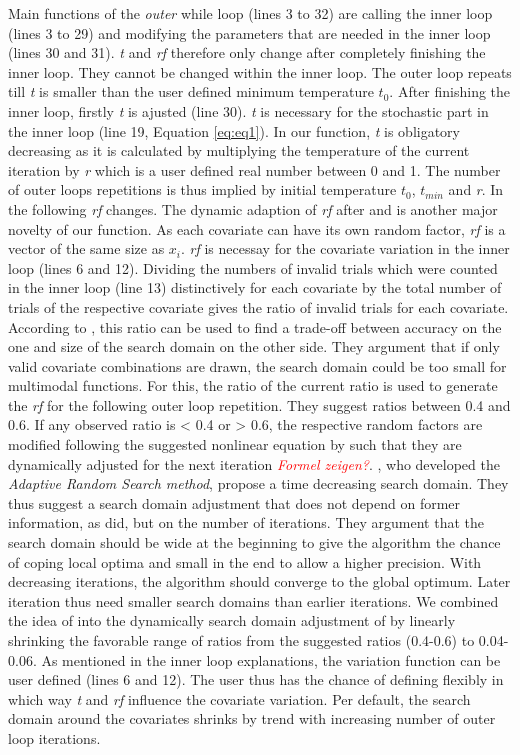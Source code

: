 Main functions of the \emph{outer} while loop (lines 3 to 32) are calling the inner loop (lines 3 to 29) and modifying the parameters that are needed in the inner loop (lines 30 and 31). \textit{t} and \textit{rf} therefore only change after completely finishing the inner loop. They cannot be changed within the inner loop. The outer loop repeats till \textit{t} is smaller than the user defined minimum temperature $t_0$. After finishing the inner loop, firstly \textit{t} is ajusted (line 30). \textit{t} is necessary for the stochastic part in the inner loop (line 19, Equation \ref{eq:eq1}). In our function, \textit{t} is obligatory decreasing as it is calculated by multiplying the temperature of the current iteration by \textit{r} which is a user defined real number between 0 and 1. The number of outer loops repetitions is thus implied by initial temperature $t_0$, $t_{min}$ and \textit{r}. In the following \textit{rf} changes. The dynamic adaption of \textit{rf} after \citet{corana_1987} and \citet{pronzato_1984} is another major novelty of our function. As each covariate can have its own random factor, \textit{rf} is a vector of the same size as $x_i$. \textit{rf} is necessay for the covariate variation in the inner loop (lines 6 and 12). Dividing the numbers of invalid trials which were counted in the inner loop (line 13) distinctively for each covariate by the total number of trials of the respective covariate gives the ratio of invalid trials for each covariate. According to \citep{corana_1987}, this ratio can be used to find a trade-off between accuracy on the one and size of the search domain on the other side. They argument that if only valid covariate combinations are drawn, the search domain could be too small for multimodal functions. For this, the ratio of the current ratio is used to generate the \textit{rf} for the following outer loop repetition. They suggest ratios between 0.4 and 0.6. If any observed ratio is < 0.4 or > 0.6, the respective random factors are modified following the suggested nonlinear equation by \citet{corana_1987} such that they are dynamically adjusted for the next iteration \textcolor{red}{\textit{Formel zeigen?}}. \citet{pronzato_1984}, who developed the \emph{Adaptive Random Search method}, propose a time decreasing search domain. They thus suggest a search domain adjustment that does not depend on former information, as \citet{corana_1987} did, but on the number of iterations. They argument that the search domain should be wide at the beginning to give the algorithm the chance of coping local optima and small in the end to allow a higher precision. With decreasing iterations, the algorithm should converge to the global optimum. Later iteration thus need smaller search domains than earlier iterations. We combined the idea of \citet{corana_1987} into the dynamically search domain adjustment of \citep{corana_1987} by linearly shrinking the favorable range of ratios from the suggested ratios (0.4-0.6) to 0.04-0.06. As mentioned in the inner loop explanations, the variation function can be user defined (lines 6 and 12). The user thus has the chance of defining flexibly in which way \textit{t} and \textit{rf} influence the covariate variation. Per default, the search domain around the covariates shrinks by trend with increasing number of outer loop iterations.

